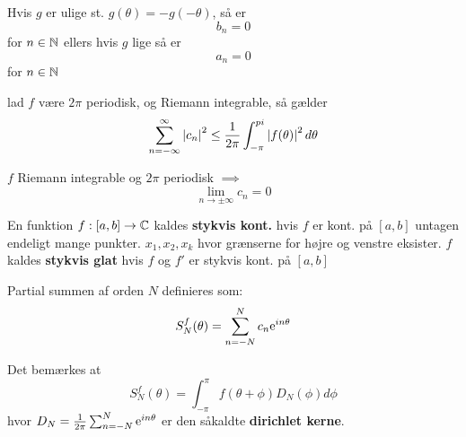 \begin{remark}
  Hvis $g$ er ulige st. $g(\theta) = -g(-\theta)$, så er
  \begin{equation*}
    b_{n} = 0
  \end{equation*}
  for $n \in \mathbb{N}$ ellers hvis $g$ lige så er
  \begin{equation*}
    a_{n} = 0
  \end{equation*}
  for $n \in \mathbb{N}$
\end{remark}

\begin{theorem}
  lad $f$ være $2\pi$ periodisk, og Riemann integrable, så gælder
  \begin{equation*}
    \sum_{n=-\infty}^{\infty} \left|c_{n}\right|^{2} \leq \frac{1}{2\pi} \int_{-\pi}^{pi} \left|f(\theta)\right|^{2} d \theta
  \end{equation*}
\end{theorem}

\begin{lemma}
  $f$ Riemann integrable og $2\pi$ periodisk $\implies$
  \begin{equation*}
    \lim_{n \to \pm \infty} c_{n} = 0
  \end{equation*}
\end{lemma}

\begin{definition}
En funktion $f: [a, b] \to \mathbb{C}$ kaldes \textbf{stykvis kont.} hvis $f$ er kont. på $[a, b]$ untagen endeligt mange punkter. $x_{1}, x_{2}, x_{k}$ hvor grænserne for højre og venstre eksister. $f$ kaldes \textbf{stykvis glat} hvis $f$ og $f'$ er stykvis kont. på $[a, b]$
\end{definition}

\begin{definition}
  Partial summen af orden $N$ definieres som:
  \begin{equation*}
    S_{N}^{f} (\theta) = \sum_{n=-N}^N c_{n} \mathrm{e}^{in \theta}
  \end{equation*}
\end{definition}

\begin{remark}
  Det bemærkes at
  \begin{equation*}
    S_{N}^{f}(\theta) = \int_{-\pi}^{\pi} f(\theta + \phi) D_{N}(\phi) d \phi
  \end{equation*}
  hvor $D_{N} = \frac{1}{2\pi} \sum_{n=-N}^N \mathrm{e}^{in \theta}$ er den såkaldte \textbf{dirichlet kerne}.
\end{remark}


